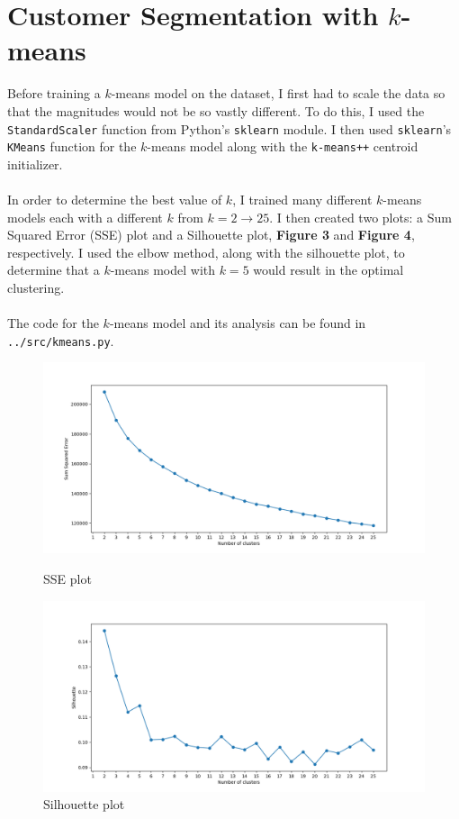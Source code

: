 \documentclass[12pt, notitlepage]{article}
\begin{document}
\section{Customer Segmentation with $k$-means}
Before training a $k$-means model on the dataset, I first had to scale the data so that the magnitudes would not be so vastly different. To do this, I used the \texttt{StandardScaler} function from Python's \texttt{sklearn} module. I then used \texttt{sklearn}'s \texttt{KMeans} function for the $k$-means model along with the \texttt{k-means++} centroid initializer. \\\\
In order to determine the best value of $k$, I trained many different $k$-means models each with a different $k$ from $k=2 \rightarrow 25$. I then created two plots: a Sum Squared Error (SSE) plot and a Silhouette plot, \textbf{Figure 3} and \textbf{Figure 4}, respectively. I used the elbow method, along with the silhouette plot, to determine that a $k$-means model with $k=5$ would result in the optimal clustering.\\\\
The code for the $k$-means model and its analysis can be found in \texttt{../src/kmeans.py}.
\begin{figure}[H]
	\centering
	\includegraphics[scale=0.6]{kmeans_SSE.png}
	\caption{SSE plot}
	\includegraphics[scale=0.6]{kmeans_silhouette.png}
	\caption{Silhouette plot}
\end{figure}
\end{document}
